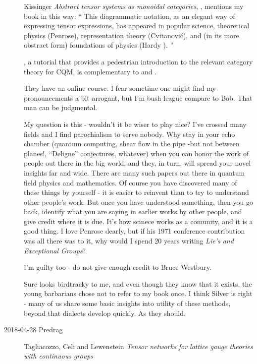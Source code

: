 \begin{description}
Kissinger
{\em Abstract tensor systems as monoidal categories},
, mentions my book in this way: ``
This diagrammatic notation, as an elegant way of expressing tensor expressions,
has appeared in popular science, theoretical physics (Penrose), representation
theory (Cvitanovi{\'c}), and (in its more abstract form) foundations of
physics (Hardy ).
''

, a tutorial that provides a pedestrian introduction to the
relevant category theory for CQM, is complementary to  and
.

They have an  {online
course}. I fear sometime one might find
 {my
pronouncements} a bit arrogant, but I'm bush league compare to Bob. That man
can be judgmental.

My question is this - wouldn't it be wiser to play nice? I've crossed many
fields and I find parochialism to serve nobody. Why stay in your echo chamber
(quantum computing, shear flow in the pipe -but not between planes!,
``Deligne'' conjectures, whatever) when you can honor the work of people out
there in the big world, and they, in turn, will spread your novel insights far
and wide. There are many such papers out there in quantum field physics and
mathematics. Of course you have discovered many of these things by yourself -
it is easier to reinvent than to try to understand other people's work. But
once you have understood something, then you go back, identify what you are
saying in earlier works by other people, and give credit where it is due. It's
how scinece works as a comunity, and it is a good thing. I love Penrose dearly,
but if his 1971 conference contribution was all there was to
it, why would I spend 20 years writing {\em Lie's and Exceptional Groups}?

I'm guilty too - do not give enough credit to Bruce Westbury.

Sure looks birdtracky to me, and even though they know that it exists, the
young barbarians chose not to refer to my book once. I think
Silver is right - many of us share some basic insights into
utility of these methods, beyond that dialects develop quickly. As they should.

\item[2018-04-28 Predrag]
Tagliacozzo, Celi and Lewenstein
{\em Tensor networks for lattice gauge theories with continuous groups}


\end{description}
